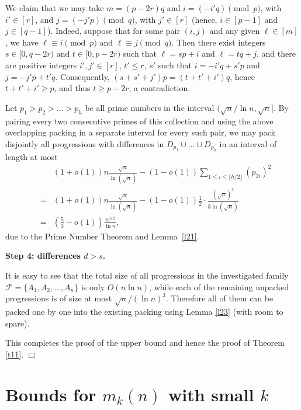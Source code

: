 \documentclass[12pt]{amsart}
\theoremstyle{plain}
\numberwithin{equation}{section}
\begin{document}
	We claim that we may take $m=(p-2r)q$ and $i=(-i'q) \pmod p$, with $i'\in[r]$, and $j=(-j'p) \pmod q$, with $j'\in[r]$ (hence, $i\in [p-1]$ and $j\in [q-1]$). Indeed, suppose that for some pair $(i,j)$ and any given $\ell\in [m]$, we have $\ell\equiv i\pmod p$ and $\ell\equiv j\pmod q$. Then there exist integers $s\in [0,q-2r)$ and $t\in [0,p-2r)$ such that $\ell = sp+i$ and $\ell = tq+j$,
	and there are positive integers $i',j'\in[r]$, $t'\leqslant r$, $s'$ such that $i=-i'q+s'p$ and $j=-j'p+t'q$. Consequently, $(s+s'+j')p=(t+t'+i')q$, hence $t+t'+i'\geqslant p$, and thus $t\geqslant p-2r$, a contradiction.
	
	Let $p_1>p_2>\ldots>p_h$ be all prime numbers in the interval $(\sqrt n/\ln n, \sqrt n]$. By pairing every two consecutive primes of this collection and using the above overlapping packing in a separate interval for every such pair, we may pack disjointly all progressions with differences in $D_{p_1}\cup\ldots\cup D_{p_h}$ in an interval of length at most
	\begin{eqnarray}
		&&(1+o(1))n\frac{\sqrt{n}}{\ln (\sqrt{n})}-(1-o(1))\sum_{1\leqslant i \leqslant \lfloor h/2\rfloor}\left(p_{2i}\right)^2 \nonumber\\
		&=& 
		(1+o(1))n\frac{\sqrt{n}}{\ln (\sqrt{n})}-(1-o(1))\frac{1}{2}\cdot \frac{(\sqrt{n})^3}{3\ln(\sqrt{n})} \nonumber\\
		&=& \left(\frac{5}{3}-o(1)\right)\frac{n^{3/2}}{\ln n}, \label{tighter_packing}
	\end{eqnarray}
	due to the Prime Number Theorem and Lemma~\ref{l21}.

\vspace{0.2cm}

\noindent
{\bf Step 4: differences $d > s$.}
\vspace{0.1cm}

\noindent
It is easy to see that the total size of all progressions in the investigated family $\mathcal{F}=\{A_1,A_2,\ldots, A_n\}$ is only
$O(n \ln n)$, while each of the remaining unpacked progressions is of size at most $\sqrt n/ (\ln n)^3$. Therefore all of them can be packed one by one into the existing packing using Lemma \ref{l23} (with room to spare).

This completes the proof of the upper bound and hence the proof of Theorem \ref{t11}. \hfill $\Box$


	\section{Bounds for $m_k(n)$ with small $k$}
	
\end{document}
